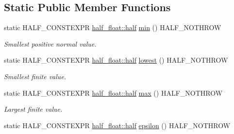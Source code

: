\subsection*{Static Public Member Functions}
\begin{DoxyCompactItemize}
\item 
static H\+A\+L\+F\+\_\+\+C\+O\+N\+S\+T\+E\+X\+PR \hyperlink{classhalf__float_1_1half}{half\+\_\+float\+::half} \hyperlink{classstd_1_1numeric__limits_3_01half__float_1_1half_01_4_a52dd448e009c0a1a7e463c773cbd8f9e}{min} () H\+A\+L\+F\+\_\+\+N\+O\+T\+H\+R\+OW\hypertarget{classstd_1_1numeric__limits_3_01half__float_1_1half_01_4_a52dd448e009c0a1a7e463c773cbd8f9e}{}\label{classstd_1_1numeric__limits_3_01half__float_1_1half_01_4_a52dd448e009c0a1a7e463c773cbd8f9e}

\begin{DoxyCompactList}\small\item\em Smallest positive normal value. \end{DoxyCompactList}\item 
static H\+A\+L\+F\+\_\+\+C\+O\+N\+S\+T\+E\+X\+PR \hyperlink{classhalf__float_1_1half}{half\+\_\+float\+::half} \hyperlink{classstd_1_1numeric__limits_3_01half__float_1_1half_01_4_abe8e9622711ffafb029c35b349d18af4}{lowest} () H\+A\+L\+F\+\_\+\+N\+O\+T\+H\+R\+OW\hypertarget{classstd_1_1numeric__limits_3_01half__float_1_1half_01_4_abe8e9622711ffafb029c35b349d18af4}{}\label{classstd_1_1numeric__limits_3_01half__float_1_1half_01_4_abe8e9622711ffafb029c35b349d18af4}

\begin{DoxyCompactList}\small\item\em Smallest finite value. \end{DoxyCompactList}\item 
static H\+A\+L\+F\+\_\+\+C\+O\+N\+S\+T\+E\+X\+PR \hyperlink{classhalf__float_1_1half}{half\+\_\+float\+::half} \hyperlink{classstd_1_1numeric__limits_3_01half__float_1_1half_01_4_a18dff56a912af3306b967a49a7a1a859}{max} () H\+A\+L\+F\+\_\+\+N\+O\+T\+H\+R\+OW\hypertarget{classstd_1_1numeric__limits_3_01half__float_1_1half_01_4_a18dff56a912af3306b967a49a7a1a859}{}\label{classstd_1_1numeric__limits_3_01half__float_1_1half_01_4_a18dff56a912af3306b967a49a7a1a859}

\begin{DoxyCompactList}\small\item\em Largest finite value. \end{DoxyCompactList}\item 
static H\+A\+L\+F\+\_\+\+C\+O\+N\+S\+T\+E\+X\+PR \hyperlink{classhalf__float_1_1half}{half\+\_\+float\+::half} \hyperlink{classstd_1_1numeric__limits_3_01half__float_1_1half_01_4_ab0a429948d6c6be91abbd36f4d73eb08}{epsilon} () H\+A\+L\+F\+\_\+\+N\+O\+T\+H\+R\+OW\hypertarget{classstd_1_1numeric__limits_3_01half__float_1_1half_01_4_ab0a429948d6c6be91abbd36f4d73eb08}{}\label{classstd_1_1numeric__limits_3_01half__float_1_1half_01_4_ab0a429948d6c6be91abbd36f4d73eb08}


\end{DoxyCompactItemize}

